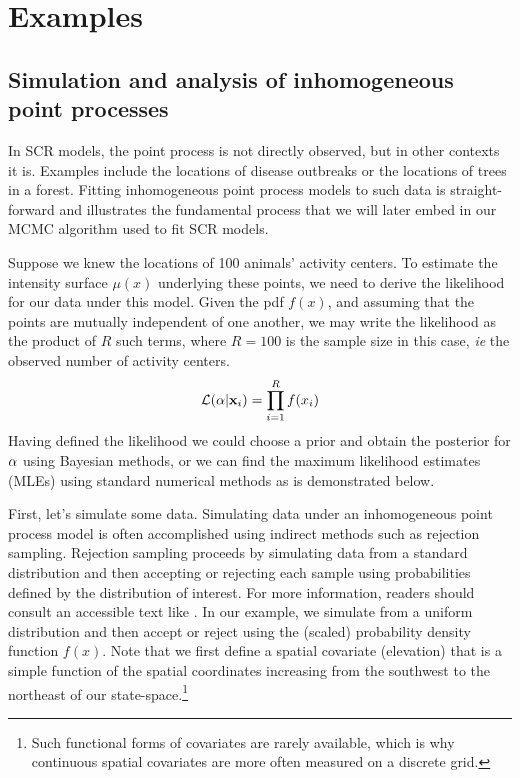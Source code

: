 \section{Examples}

\subsection{Simulation and analysis of inhomogeneous point processes}

In SCR models, the point process is not directly observed, but in
other contexts it is. %
Examples include the locations of disease
outbreaks or the locations of trees in a forest. Fitting inhomogeneous
point process models to such data is straight-forward and illustrates
the fundamental process that we will later embed in our MCMC algorithm
used to fit SCR models.

Suppose we knew the locations of 100 animals' activity
centers. To estimate the intensity surface $\mu(x)$ underlying these points, we
need to derive the likelihood for our data under this model. Given the
pdf $f(x)$, and assuming that the points are
mutually independent of one another, we may write
the likelihood as the product
of $R$ such terms, where $R=100$ is the sample size in this case,
\emph{ie} the observed number of activity centers.
\[
\mathcal{L}({\bf \alpha} | {\bf x}_i) = \prod_{i=1}^R f(x_i)
\]
Having defined the likelihood we could choose a prior and obtain the posterior for
$\bf \alpha$ using Bayesian methods, or we can find the maximum likelihood
estimates (MLEs) using standard numerical methods as is demonstrated
below.

First, let's simulate some data. Simulating data under an inhomogeneous point process model is often
accomplished using indirect methods such as rejection
sampling. Rejection sampling proceeds by
simulating data from a standard distribution and then accepting or
rejecting each sample using probabilities defined by the distribution
of interest. For more information, readers should consult an
accessible text like \citet{robert_casella:2004}. In our example, we
simulate from a uniform distribution and then accept or reject using
the (scaled) probability density function $f(x)$. Note that we first define a
spatial covariate (elevation) that is a simple function of the spatial
coordinates increasing from the southwest to the northeast of our
state-space.\footnote{Such functional forms of
covariates are rarely available, which is why continuous spatial
covariates are more often measured on a discrete grid.} 

